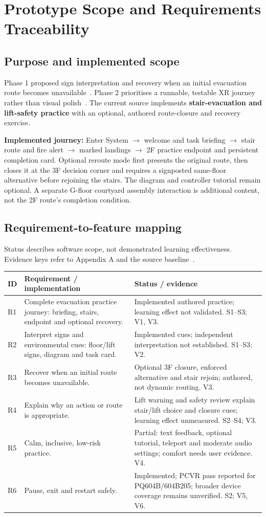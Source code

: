\documentclass[12pt,a4paper]{article}
\begin{document}
\section{Prototype Scope and Requirements Traceability}
\subsection{Purpose and implemented scope}
Phase 1 proposed sign interpretation and recovery when an initial evacuation
route becomes unavailable~\cite{phase1}. Phase 2 prioritises a runnable,
testable XR journey rather than visual polish~\cite{brief}. The current source
implements \textbf{stair-evacuation and lift-safety practice} with an optional,
authored route-closure and recovery exercise.

\textbf{Implemented journey:} Enter System $\rightarrow$ welcome and task
briefing $\rightarrow$ stair route and fire alert $\rightarrow$ marked
landings $\rightarrow$ 2F practice endpoint and persistent completion card.
Optional reroute mode first presents the original route, then closes it at the
3F decision corner and requires a signposted same-floor alternative before
rejoining the stairs. The diagram and controller tutorial remain optional.
A separate G-floor courtyard assembly interaction is additional content, not
the 2F route's completion condition.

\subsection{Requirement-to-feature mapping}
Status describes software scope, not demonstrated learning effectiveness.
Evidence keys refer to Appendix A and the source baseline~\cite{implementation}.

\begin{tabularx}{\textwidth}{@{}p{0.65cm}YY@{}}
\toprule
\textbf{ID} & \textbf{Requirement / implementation} & \textbf{Status / evidence} \\
\midrule
R1 & Complete evacuation practice journey: briefing, stairs, endpoint and optional recovery. &
Implemented authored practice; learning effect not validated. S1--S3; V1, V3. \\
R2 & Interpret signs and environmental cues: floor/lift signs, diagram and task card. &
Implemented cues; independent interpretation not established. S1--S3; V2. \\
R3 & Recover when an initial route becomes unavailable. &
Optional 3F closure, enforced alternative and stair rejoin; authored, not dynamic routing. V3. \\
R4 & Explain why an action or route is appropriate. &
Lift warning and safety review explain stair/lift choice and closure cues; learning effect unmeasured. S2--S4; V3. \\
R5 & Calm, inclusive, low-risk practice. &
Partial: text feedback, optional tutorial, teleport and moderate audio settings; comfort needs user evidence. V4. \\
R6 & Pause, exit and restart safely. &
Implemented; PCVR pass reported for PQ604B/604B205; broader device coverage remains unverified. S2; V5, V6. \\
\bottomrule
\end{tabularx}
\end{document}
